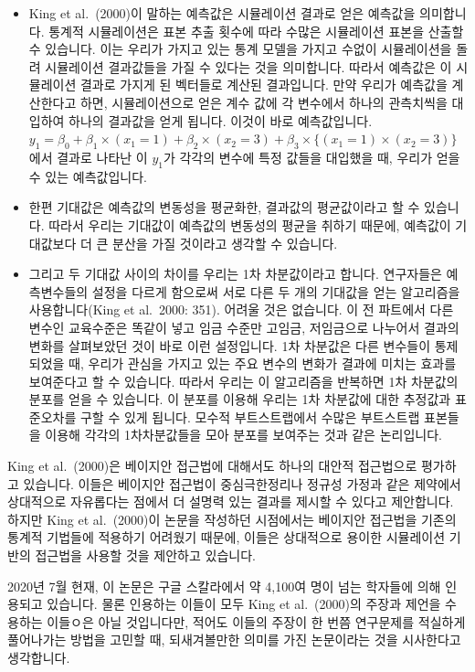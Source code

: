 \documentclass[
]{book}
\begin{document}
\begin{itemize}
\item
  King et al.~(2000)이 말하는 예측값은 시뮬레이션 결과로 얻은 예측값을 의미합니다. 통계적 시뮬레이션은 표본 추출 횟수에 따라 수많은 시뮬레이션 표본을 산출할 수 있습니다. 이는 우리가 가지고 있는 통계 모델을 가지고 수없이 시뮬레이션을 돌려 시뮬레이션 결과값들을 가질 수 있다는 것을 의미합니다. 따라서 예측값은 이 시뮬레이션 결과로 가지게 된 벡터들로 계산된 결과입니다. 만약 우리가 예측값을 계산한다고 하면, 시뮬레이션으로 얻은 계수 값에 각 변수에서 하나의 관측치씩을 대입하여 하나의 결과값을 얻게 됩니다. 이것이 바로 예측값입니다. \(y_1 = \beta_0 + \beta_1\times(x_1=1) + \beta_2\times(x_2=3) + \beta_3\times\{(x_1=1)\times(x_2=3)\}\)에서 결과로 나타난 이 \(y_1\)가 각각의 변수에 특정 값들을 대입했을 때, 우리가 얻을 수 있는 예측값입니다.
\item
  한편 기대값은 예측값의 변동성을 평균화한, 결과값의 평균값이라고 할 수 있습니다. 따라서 우리는 기대값이 예측값의 변동성의 평균을 취하기 때문에, 예측값이 기대값보다 더 큰 분산을 가질 것이라고 생각할 수 있습니다.
\item
  그리고 두 기대값 사이의 차이를 우리는 1차 차분값이라고 합니다. 연구자들은 예측변수들의 설정을 다르게 함으로써 서로 다른 두 개의 기대값을 얻는 알고리즘을 사용합니다(King et al.~2000: 351). 어려울 것은 없습니다. 이 전 파트에서 다른 변수인 교육수준은 똑같이 넣고 임금 수준만 고임금, 저임금으로 나누어서 결과의 변화를 살펴보았던 것이 바로 이런 설정입니다. 1차 차분값은 다른 변수들이 통제되었을 때, 우리가 관심을 가지고 있는 주요 변수의 변화가 결과에 미치는 효과를 보여준다고 할 수 있습니다. 따라서 우리는 이 알고리즘을 반복하면 1차 차분값의 분포를 얻을 수 있습니다. 이 분포를 이용해 우리는 1차 차분값에 대한 추정값과 표준오차를 구할 수 있게 됩니다. 모수적 부트스트랩에서 수많은 부트스트랩 표본들을 이용해 각각의 1차차분값들을 모아 분포를 보여주는 것과 같은 논리입니다.
\end{itemize}

King et al.~(2000)은 베이지안 접근법에 대해서도 하나의 대안적 접근법으로 평가하고 있습니다. 이들은 베이지안 접근법이 중심극한정리나 정규성 가정과 같은 제약에서 상대적으로 자유롭다는 점에서 더 설명력 있는 결과를 제시할 수 있다고 제안합니다. 하지만 King et al.~(2000)이 논문을 작성하던 시점에서는 베이지안 접근법을 기존의 통계적 기법들에 적용하기 어려웠기 때문에, 이들은 상대적으로 용이한 시뮬레이션 기반의 접근법을 사용할 것을 제안하고 있습니다.

2020년 7월 현재, 이 논문은 구글 스칼라에서 약 4,100여 명이 넘는 학자들에 의해 인용되고 있습니다. 물론 인용하는 이들이 모두 King et al.~(2000)의 주장과 제언을 수용하는 이들ㅇ은 아닐 것입니다만, 적어도 이들의 주장이 한 번쯤 연구문제를 적실하게 풀어나가는 방법을 고민할 때, 되새겨볼만한 의미를 가진 논문이라는 것을 시사한다고 생각합니다.
\end{document}
